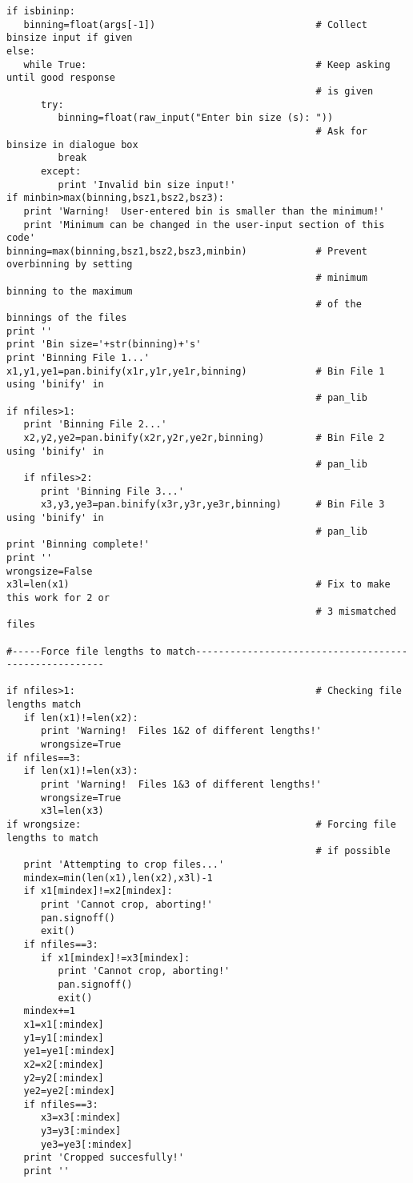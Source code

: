 \begin{verbatim}
if isbininp:
   binning=float(args[-1])                            # Collect binsize input if given
else:
   while True:                                        # Keep asking until good response
                                                      # is given
      try:
         binning=float(raw_input("Enter bin size (s): "))
                                                      # Ask for binsize in dialogue box
         break
      except:
         print 'Invalid bin size input!'
if minbin>max(binning,bsz1,bsz2,bsz3):
   print 'Warning!  User-entered bin is smaller than the minimum!'
   print 'Minimum can be changed in the user-input section of this code'
binning=max(binning,bsz1,bsz2,bsz3,minbin)            # Prevent overbinning by setting
                                                      # minimum binning to the maximum
                                                      # of the binnings of the files
print ''
print 'Bin size='+str(binning)+'s'  
print 'Binning File 1...'
x1,y1,ye1=pan.binify(x1r,y1r,ye1r,binning)            # Bin File 1 using 'binify' in
                                                      # pan_lib
if nfiles>1:
   print 'Binning File 2...'
   x2,y2,ye2=pan.binify(x2r,y2r,ye2r,binning)         # Bin File 2 using 'binify' in
                                                      # pan_lib
   if nfiles>2:
      print 'Binning File 3...'
      x3,y3,ye3=pan.binify(x3r,y3r,ye3r,binning)      # Bin File 3 using 'binify' in
                                                      # pan_lib
print 'Binning complete!'
print ''
wrongsize=False
x3l=len(x1)                                           # Fix to make this work for 2 or
                                                      # 3 mismatched files

#-----Force file lengths to match------------------------------------------------------

if nfiles>1:                                          # Checking file lengths match
   if len(x1)!=len(x2):
      print 'Warning!  Files 1&2 of different lengths!'
      wrongsize=True
if nfiles==3:
   if len(x1)!=len(x3):
      print 'Warning!  Files 1&3 of different lengths!'
      wrongsize=True
      x3l=len(x3)
if wrongsize:                                         # Forcing file lengths to match
                                                      # if possible
   print 'Attempting to crop files...'
   mindex=min(len(x1),len(x2),x3l)-1
   if x1[mindex]!=x2[mindex]:
      print 'Cannot crop, aborting!'
      pan.signoff()
      exit()
   if nfiles==3:
      if x1[mindex]!=x3[mindex]:
         print 'Cannot crop, aborting!'
         pan.signoff()
         exit()
   mindex+=1
   x1=x1[:mindex]
   y1=y1[:mindex]
   ye1=ye1[:mindex]
   x2=x2[:mindex]
   y2=y2[:mindex]
   ye2=ye2[:mindex]
   if nfiles==3:
      x3=x3[:mindex]
      y3=y3[:mindex]
      ye3=ye3[:mindex]
   print 'Cropped succesfully!'
   print ''
   

\end{verbatim}
